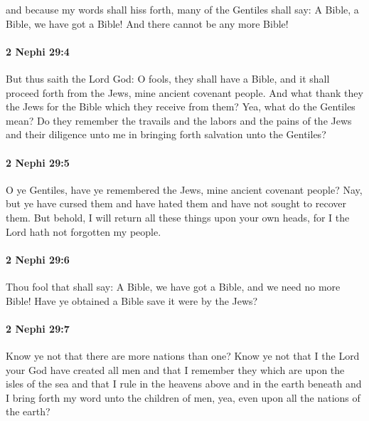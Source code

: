 			and because my words shall hiss forth,
			many of the Gentiles shall say:
			A Bible, a Bible, we have got a Bible!
			And there cannot be any more Bible!

		\paragraph{2 Nephi 29:4} %
			\label{2NEPHI-29-4}

			But thus saith the Lord God:
			O fools, they shall have a Bible,
			and it shall proceed forth from the Jews, mine ancient covenant people.
			And what thank they the Jews for the Bible which they receive from them?
			Yea, what do the Gentiles mean?
			Do they remember the travails and the labors and the pains of the Jews
			and their diligence unto me in bringing forth salvation unto the Gentiles?

		\paragraph{2 Nephi 29:5} %
			\label{2NEPHI-29-5}

			O ye Gentiles, have ye remembered the Jews, mine ancient covenant people?
			Nay, but ye have cursed them and have hated them
			and have not sought to recover them.
			But behold, I will return all these things upon your own heads,
			for I the Lord hath not forgotten my people.

		\paragraph{2 Nephi 29:6} %
			\label{2NEPHI-29-6}

			Thou fool that shall say:
			A Bible, we have got a Bible, and we need no more Bible!
			Have ye obtained a Bible save it were by the Jews?

		\paragraph{2 Nephi 29:7} %
			\label{2NEPHI-29-7}

			Know ye not that there are more nations than one?
			Know ye not that I the Lord your God have created all men
			and that I remember they which are upon the isles of the sea
			and that I rule in the heavens above and in the earth beneath
			and I bring forth my word unto the children of men,
			yea, even upon all the nations of the earth?


